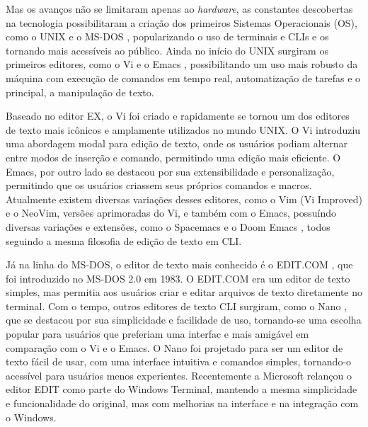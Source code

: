 Mas os avanços não se limitaram apenas ao \textit{hardware}, as constantes descobertas na
tecnologia possibilitaram a criação dos primeiros Sistemas Operacionais (OS),
como o UNIX \cite{UnixArchive} e o MS-DOS \cite{ComputerHistoryMuseum}, popularizando
o uso de terminais e CLIs e os tornando mais acessíveis ao público. Ainda no
início do UNIX surgiram os primeiros editores, como o Vi \cite{Joy_Vi} e o Emacs
\cite{Stallman1981}, possibilitando um uso mais robusto da máquina com execução
de comandos em tempo real, automatização de tarefas e o principal, a manipulação
de texto.

Baseado no editor EX, o Vi foi criado e rapidamente se tornou um dos editores de
texto mais icônicos e amplamente utilizados no mundo UNIX. O Vi introduziu uma
abordagem modal para edição de texto, onde os usuários podiam alternar entre modos
de inserção e comando, permitindo uma edição mais eficiente. O Emacs, por outro
lado se destacou por sua extensibilidade e personalização, permitindo que os usuários
criassem seus próprios comandos e macros. Atualmente existem diversas variações
desses editores, como o Vim (Vi Improved) \cite{Vim} e o NeoVim,
\cite{Neovim_Project} versões aprimoradas do Vi, e também com o Emacs, possuíndo
diversas variações e extensões, como o Spacemacs \cite{Spacemacs} e o Doom Emacs
\cite{DoomEmacs}, todos seguindo a mesma filosofia de edição de texto em CLI.

Já na linha do MS-DOS, o editor de texto mais conhecido é o EDIT.COM \cite{MicrosoftEdit2025},
que foi introduzido no MS-DOS 2.0 em 1983. O EDIT.COM era um editor de texto
simples, mas permitia aos usuários criar e editar arquivos de texto diretamente no
terminal. Com o tempo, outros editores de texto CLI surgiram, como o Nano
\cite{Nano2025}, que se destacou por sua simplicidade e facilidade de uso,
tornando-se uma escolha popular para usuários que preferiam uma interfac e mais
amigável em comparação com o Vi e o Emacs. O Nano foi projetado para ser um editor
de texto fácil de usar, com uma interface intuitiva e comandos simples, tornando-o
acessível para usuários menos experientes. Recentemente a Microsoft relançou o
editor EDIT como parte do Windows Terminal, mantendo a mesma simplicidade e funcionalidade
do original, mas com melhorias na interface e na integração com o Windows.

